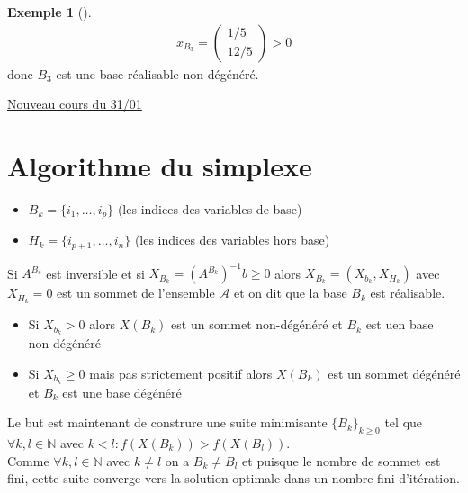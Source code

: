 \documentclass{article}
\theoremstyle{plain}%
\theoremstyle{definition}
\newtheorem{exmp}{Exemple}[section]
\theoremstyle{remark}
\begin{document}
\begin{exmp}[]
    \begin{align*}
        x_{B_3} = \begin{pmatrix}1/5 \\ 12/5\end{pmatrix} > 0        
    \end{align*}
    donc $ B_3 $ est une base réalisable non dégénéré.
\end{exmp}

\underline{Nouveau cours du 31/01} \\
\section{Algorithme du simplexe}

\begin{itemize}
    \item $ B_k = \{i_1, \dots, i_p\} $ (les indices des variables de base)
    \item $ H_k = \{i_{p+1}, \dots, i_n\} $ (les indices des variables hors base)
\end{itemize}
Si $ A^{B_c} $ est inversible et si $ X_{B_k} = (A^{B_k})^{-1} b \geq 0$ alors $ X_{B_k} = (X_{b_k}, X_{H_k})$ avec $ X_{H_k} = 0 $ est un sommet de l'ensemble $ \mathcal{A} $ et on dit que la base $ B_k $ est réalisable.
\begin{itemize}
    \item Si $ X_{b_k} > 0 $ alors $ X(B_k) $ est un sommet non-dégénéré et $ B_k $ est uen base non-dégénéré
    \item Si $ X_{b_k} \geq 0$ mais pas strictement positif alors $ X(B_k) $ est un sommet dégénéré et $ B_k $ est une base dégénéré
\end{itemize}
Le but est maintenant de construre une suite minimisante $ \{B_k\}_{k \geq 0} $ tel que $ \forall k, l \in \mathbb{N} $ avec $ k<l : f(X(B_k)) > f(X(B_l)) $. \\
Comme $ \forall k,l \in \mathbb{N} $ avec $ k \neq l $ on a $ B_k \neq B_l $ et puisque le nombre de sommet est fini, cette suite converge vers la solution optimale dans un nombre fini d'itération. 
\end{document}
